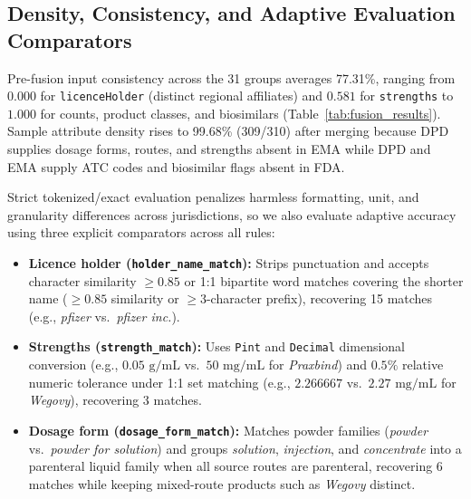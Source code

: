 \documentclass{llncs}
\begin{document}
\subsection{Density, Consistency, and Adaptive Evaluation Comparators}
Pre-fusion input consistency across the 31 groups averages 77.31\%, ranging from $0.000$ for \texttt{licenceHolder} (distinct regional affiliates) and $0.581$ for \texttt{strengths} to $1.000$ for counts, product classes, and biosimilars (Table~\ref{tab:fusion_results}). Sample attribute density rises to 99.68\% (309/310) after merging because DPD supplies dosage forms, routes, and strengths absent in EMA while DPD and EMA supply ATC codes and biosimilar flags absent in FDA.

Strict tokenized/exact evaluation penalizes harmless formatting, unit, and granularity differences across jurisdictions, so we also evaluate adaptive accuracy using three explicit comparators across all rules:
\begin{itemize}
  \item \textbf{Licence holder (\texttt{holder\_name\_match}):} Strips punctuation and accepts character similarity $\ge 0.85$ or 1:1 bipartite word matches covering the shorter name ($\ge 0.85$ similarity or $\ge 3$-character prefix), recovering 15 matches (e.g., \textit{pfizer} vs.\ \textit{pfizer inc.}).
  \item \textbf{Strengths (\texttt{strength\_match}):} Uses \texttt{Pint} and \texttt{Decimal} dimensional conversion (e.g., $0.05\text{ g/mL}$ vs.\ $50\text{ mg/mL}$ for \textit{Praxbind}) and $0.5\%$ relative numeric tolerance under 1:1 set matching (e.g., $2.266667$ vs.\ $2.27\text{ mg/mL}$ for \textit{Wegovy}), recovering 3 matches.
  \item \textbf{Dosage form (\texttt{dosage\_form\_match}):} Matches powder families (\textit{powder} vs.\ \textit{powder for solution}) and groups \textit{solution}, \textit{injection}, and \textit{concentrate} into a parenteral liquid family when all source routes are parenteral, recovering 6 matches while keeping mixed-route products such as \textit{Wegovy} distinct.
\end{itemize}
\end{document}
